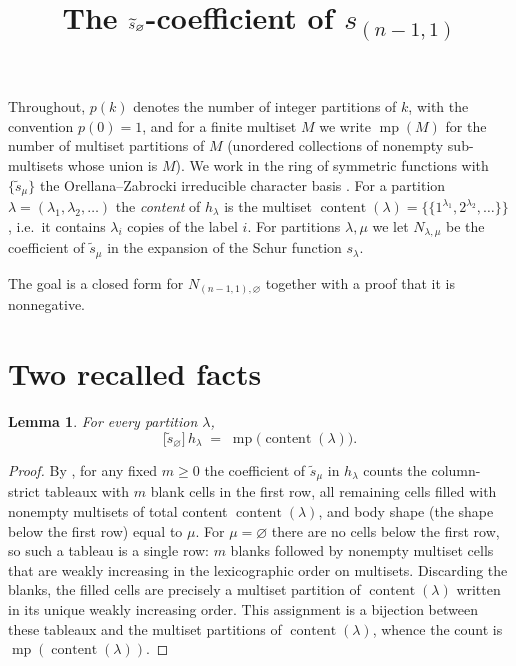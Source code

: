 \documentclass[11pt]{article}
\title{The $\stil_{\varnothing}$-coefficient of $s_{(n-1,1)}$}
\date{}
\newtheorem{lemma}{Lemma}
\theoremstyle{remark}
\DeclareMathOperator{\msp}{mp}
\newcommand{\content}{\operatorname{content}}
\newcommand{\stil}{\widetilde{s}}
\newcommand{\ones}[1]{1^{#1}}
\begin{document}
\maketitle

\noindent
Throughout, $p(k)$ denotes the number of integer partitions of $k$, with the
convention $p(0)=1$, and for a finite multiset $M$ we write $\msp(M)$ for the
number of multiset partitions of $M$ (unordered collections of nonempty
sub-multisets whose union is $M$). We work in the ring of symmetric functions
with $\{\stil_\mu\}$ the Orellana--Zabrocki irreducible character basis
\cite{OZ}. For a partition $\lambda=(\lambda_1,\lambda_2,\dots)$ the
\emph{content} of $h_\lambda$ is the multiset
$\content(\lambda)=\{\!\{\ones{\lambda_1},2^{\lambda_2},\dots\}\!\}$, i.e.\ it
contains $\lambda_i$ copies of the label $i$. For partitions $\lambda,\mu$ we let
$N_{\lambda,\mu}$ be the coefficient of $\stil_\mu$ in the expansion of the Schur
function $s_\lambda$.

The goal is a closed form for $N_{(n-1,1),\varnothing}$ together with a proof
that it is nonnegative.

\section{Two recalled facts}

\begin{lemma}\label{lem:empty}
For every partition $\lambda$,
\[
  \bigl[\stil_{\varnothing}\bigr]\,h_\lambda \;=\; \msp\bigl(\content(\lambda)\bigr).
\]
\end{lemma}

\begin{proof}
By \cite[Prop.~2]{OZ}, for any fixed $m\ge 0$ the coefficient of $\stil_\mu$ in
$h_\lambda$ counts the column-strict tableaux with $m$ blank cells in the first
row, all remaining cells filled with nonempty multisets of total content
$\content(\lambda)$, and body shape (the shape below the first row) equal to
$\mu$. For $\mu=\varnothing$ there are no cells below the first row, so such a
tableau is a single row: $m$ blanks followed by nonempty multiset cells that are
weakly increasing in the lexicographic order on multisets. Discarding the blanks,
the filled cells are precisely a multiset partition of $\content(\lambda)$
written in its unique weakly increasing order. This assignment is a bijection
between these tableaux and the multiset partitions of $\content(\lambda)$, whence
the count is $\msp(\content(\lambda))$.
\end{proof}
\end{document}
